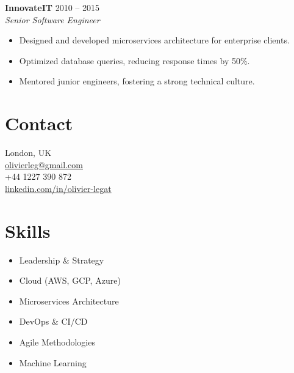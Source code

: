 \documentclass[a4paper,10pt]{article}
\begin{document}
{\begin{minipage}[t]{0.65\textwidth}
    \vspace{0.5em}
    \textbf{InnovateIT} \hfill 2010 -- 2015\\
    \textit{Senior Software Engineer}\\
    \begin{itemize}[leftmargin=1.5em, nosep]
        \item Designed and developed microservices architecture for enterprise clients.
        \item Optimized database queries, reducing response times by 50\%.
        \item Mentored junior engineers, fostering a strong technical culture.
    \end{itemize}
\end{minipage}%
\hfill%
\begin{minipage}[t]{0.32\textwidth}
    \colorbox{darkbg}{%
    \begin{minipage}[t][\textheight]{\dimexpr\textwidth-10pt}
        \raggedright
        \vspace{0.5cm} %

        \color{white} %
        \section*{\color{lightblue} Contact}
         London, UK \\
         \href{mailto:olivierleg@gmail.com}{olivierleg@gmail.com} \\
         +44 1227 390 872 \\
         \href{https://www.linkedin.com/in/olivier-legat}{linkedin.com/in/olivier-legat} \\

        \section*{\color{lightblue} Skills}
        \begin{itemize}[leftmargin=1em, nosep]
            \item Leadership \& Strategy
            \item Cloud (AWS, GCP, Azure)
            \item Microservices Architecture
            \item DevOps \& CI/CD
            \item Agile Methodologies
            \item Machine Learning
        \end{itemize}


\end{minipage}}
\end{minipage}}
\end{document}
